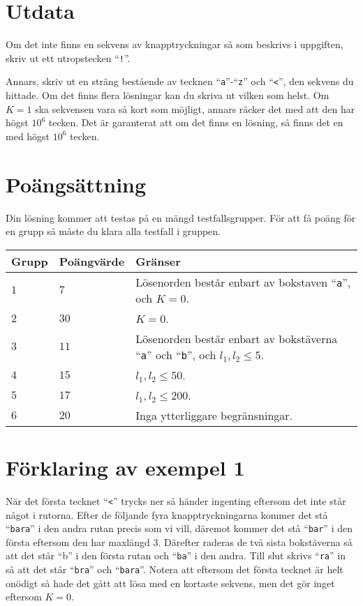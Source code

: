 \section*{Utdata}
Om det inte finns en sekvens av knapptryckningar så som beskrivs i uppgiften, skriv ut ett utropstecken ``\texttt{!}''.

Annars, skriv ut en sträng bestående av tecknen ``\texttt{a}''-``\texttt{z}'' och ``\texttt{<}'', den sekvens du hittade. Om det 
finns flera lösningar kan du skriva ut vilken som helst. Om $K = 1$ ska sekvensen vara så kort som möjligt, 
annars räcker det med att den har högst $10^6$ tecken. Det är garanterat att om det finns en lösning, 
så finns det en med högst $10^6$ tecken.

\section*{Poängsättning}
Din lösning kommer att testas på en mängd testfallsgrupper.
För att få poäng för en grupp så måste du klara alla testfall i gruppen.

\noindent
\begin{tabular}{| l | l | l |}
\hline
Grupp & Poängvärde & Gränser \\ \hline
$1$   & $7$        & Lösenorden består enbart av bokstaven ``\texttt{a}'', och $K = 0$. \\ \hline
$2$   & $30$       & $K = 0$. \\ \hline
$3$   & $11$       & Lösenorden består enbart av bokstäverna ``\texttt{a}'' och ``\texttt{b}'', och $l_1, l_2 \leq 5$.  \\ \hline
$4$   & $15$       & $l_1, l_2 \leq 50$. \\ \hline
$5$   & $17$       & $l_1, l_2 \leq 200$. \\ \hline
$6$   & $20$       & Inga ytterliggare begränsningar.  \\ \hline
\end{tabular}

\section*{Förklaring av exempel 1}
När det första tecknet ``\texttt{<}'' trycks ner så händer ingenting eftersom det inte står något i rutorna. Efter de följande
fyra knapptryckningarna kommer det stå ``\texttt{bara}'' i den andra rutan precis som vi vill, däremot kommer det stå ``\texttt{bar}'' 
i den första eftersom den har maxlängd $3$. Därefter raderas de två sista bokstäverna så att det står ``b'' i 
den första rutan och ``\texttt{ba}'' i den andra. Till slut skrivs ``\texttt{ra}'' in så att det står ``\texttt{bra}'' och ``\texttt{bara}''. Notera 
att eftersom det första tecknet är helt onödigt så hade det gått att lösa med en kortaste sekvens, men det gör inget 
eftersom $K = 0$.